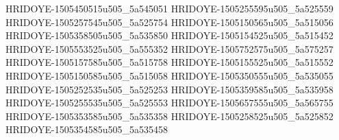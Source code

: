 HRIDOYE-1505450515u505_5a545051
HRIDOYE-1505255595u505_5a525559
HRIDOYE-1505257545u505_5a525754
HRIDOYE-1505150565u505_5a515056
HRIDOYE-1505358505u505_5a535850
HRIDOYE-1505154525u505_5a515452
HRIDOYE-1505553525u505_5a555352
HRIDOYE-1505752575u505_5a575257
HRIDOYE-1505157585u505_5a515758
HRIDOYE-1505155525u505_5a515552
HRIDOYE-1505150585u505_5a515058
HRIDOYE-1505350555u505_5a535055
HRIDOYE-1505252535u505_5a525253
HRIDOYE-1505359585u505_5a535958
HRIDOYE-1505255535u505_5a525553
HRIDOYE-1505657555u505_5a565755
HRIDOYE-1505353585u505_5a535358
HRIDOYE-1505258525u505_5a525852
HRIDOYE-1505354585u505_5a535458
